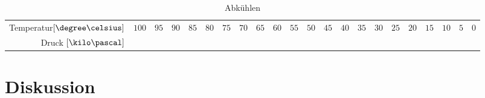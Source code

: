 \documentclass[12pt, a4paper, twoside]{scrartcl}
\begin{document}
\begin{table}
\centering
\begin{tabular}{r|c|c|c|c|c|c|c|c|c|c|c|c|c|c|c|c|c|c|c|c}
    Temperatur$[\degree\celsius]$ & $100$ & $95$ & $90$ & $85$ & $80$ & $75$ & $70$ & $65$ & $60$ & $55$ & $50$ & $45$ & $40$ & $35$ & $30$ & $25$ & $20$ & $15$ & $10$ & $5$ & $0$ \\
    Druck $[\kilo\pascal]$ &  \\
    
 \end{tabular} 
 \caption{\label{tab:}Abkühlen}
\end{table}



%    


\section{Diskussion}
\label{sec:diskussion}
\end{document}
